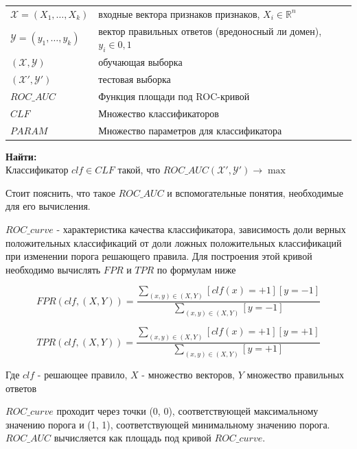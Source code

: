 \documentclass[14pt]{extreport} %
\begin{document}
\begin{tabular}{p{6cm} p{7.5cm}}
	$\mathcal{X}=(X_1,\ldots,X_k)$ & входные вектора признаков признаков, $X_i\in\mathbb{R}^n$                \\[0.1cm]
	$\mathcal{Y}=(y_1,\ldots,y_k)$ & вектор правильных ответов (вредоносный ли домен), $y_i\in{0,1}$ \\[0.1cm]
	$(\mathcal{X},\mathcal{Y})$    & обучающая выборка                                                                        \\[0.1cm]
	$(\mathcal{X'},\mathcal{Y'})$  & тестовая выборка                                                                          \\[0.1cm]
	$ROC\_AUC$                     & Функция площади под ROC-кривой                                                    \\[0.1cm]
	$CLF$                          & Множество классификаторов                                                        \\[0.1cm]
	$PARAM$                        & Множество параметров для классификатора                              \\[0.1cm]
		
\end{tabular}
	 
{\bf
	Найти:
	} \\

Классификатор $clf \in CLF$ такой, что $ROC\_AUC(\mathcal{X'},\mathcal{Y'}) \rightarrow \max$ 
\newline
	
Стоит пояснить, что такое $ROC\_AUC$ и вспомогательные понятия, необходимые для его вычисления. 
	
$ROC\_curve$ - характеристика качества классификатора, зависимость доли верных положительных классификаций от доли ложных положительных классификаций при изменении порога решающего правила. Для построения этой кривой необходимо вычислять $FPR$ и $TPR$ по формулам ниже
	
$$FPR(clf, (X, Y)) = \frac{\sum_{(x, y) \in (X, Y)}[clf(x)=+1][y=-1]}{\sum_{(x, y) \in (X, Y)}[y=-1]}$$
	
$$TPR(clf, (X, Y)) = \frac{\sum_{(x, y) \in (X, Y)}[clf(x)=+1][y=+1]}{\sum_{(x, y) \in (X, Y)}[y=+1]}$$
	
Где $clf$ - решающее правило, $X$ - множество векторов, $Y$ множество правильных ответов
	
$ROC\_curve$ проходит через точки (0, 0), соответствующей максимальному значению порога и (1, 1), соответствующей минимальному значению порога.
$ROC\_AUC$ вычисляется как площадь под кривой $ROC\_curve$.
	
\end{document}

